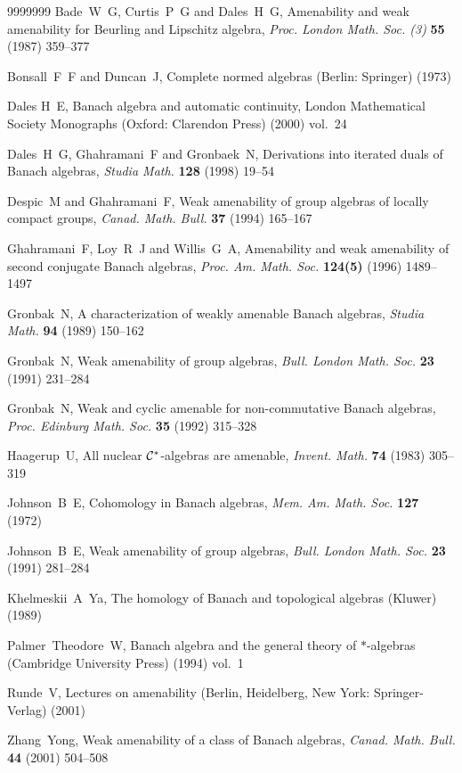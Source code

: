 \documentclass[fleqn]{mat01}
\begin{document}
\begin{thebibliography}{9999999}
 Bade~W~G, Curtis~P~G and Dales~H~G, Amenability and weak
amenability for Beurling and Lipschitz algebra, {\it Proc. London Math.
Soc. (3)} {\bf 55} (1987) 359--377 

 Bonsall~F~F and Duncan~J, Complete normed algebras
(Berlin: Springer) (1973) 

 Dales H~E, Banach algebra and automatic continuity, London Mathematical Society Monographs (Oxford: Clarendon Press) (2000) vol.~24

 Dales~H~G, Ghahramani~F and Gronbaek~N, Derivations
into iterated duals of Banach algebras, {\it Studia Math.} {\bf 128}
(1998) 19--54 

 Despic~M and Ghahramani~F, Weak amenability of group
algebras of locally compact groups, {\it Canad. Math. Bull.} {\bf 37}
(1994) 165--167 

 Ghahramani~F, Loy~R~J and Willis~G~A, Amenability and
weak amenability of second conjugate Banach algebras, {\it Proc. Am.
Math. Soc.} {\bf 124(5)} (1996) 1489--1497 

 Gronbak~N, A characterization of weakly amenable Banach
algebras, {\it Studia Math.} {\bf 94} (1989) 150--162 

 Gronbak~N, Weak amenability of group algebras, {\it Bull.
London Math. Soc.} {\bf 23} (1991) 231--284 

 Gronbak~N, Weak and cyclic amenable for non-commutative
Banach algebras, {\it Proc. Edinburg Math. Soc.} {\bf 35} (1992)
315--328 

 Haagerup~U, All nuclear ${\cal C}^*$-algebras are amenable,
{\it Invent. Math.} {\bf 74} (1983) 305--319 

 Johnson~B~E, Cohomology in Banach algebras, {\it Mem. Am.
Math. Soc.} {\bf 127} (1972) 

 Johnson~B~E, Weak amenability of group algebras, {\it
Bull. London Math. Soc.} {\bf 23} (1991) 281--284 

 Khelmeskii~A~Ya, The homology of Banach and topological
algebras (Kluwer) (1989) 

 Palmer~Theodore~W, Banach algebra and the general theory of
$*$-algebras (Cambridge University Press) (1994) vol.~1 

 Runde~V, Lectures on amenability (Berlin, Heidelberg, New
York: Springer-Verlag) (2001) 

 Zhang~Yong, Weak amenability of a class of Banach algebras,
{\it Canad. Math. Bull.} {\bf 44} (2001) 504--508
\end{thebibliography}
\end{document}
